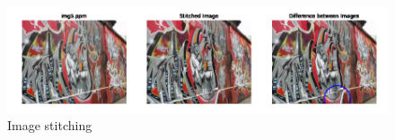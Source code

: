 \documentclass[11pt]{article}
\begin{document}
\begin{itemize}
    \begin{figure}
        \centering
        \includegraphics[width=\textwidth]{Images/33.png}
        \caption{Image stitching}
        \label{Image stitching}
    \end{figure}
      
\end{itemize}



\end{document}
